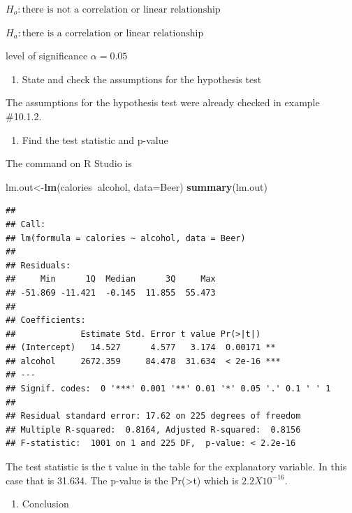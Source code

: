 \documentclass[]{book}
\newenvironment{Shaded}{\begin{snugshade}}{\end{snugshade}}
\newcommand{\DataTypeTok}[1]{\textcolor[rgb]{0.13,0.29,0.53}{#1}}
\newcommand{\KeywordTok}[1]{\textcolor[rgb]{0.13,0.29,0.53}{\textbf{#1}}}
\newcommand{\NormalTok}[1]{#1}
\newcommand{\OperatorTok}[1]{\textcolor[rgb]{0.81,0.36,0.00}{\textbf{#1}}}
\providecommand{\tightlist}{%
  \setlength{\itemsep}{0pt}\setlength{\parskip}{0pt}}
\begin{document}
\(H_o: \text{there is not a correlation or linear relationship}\)

\(H_a: \text{there is a correlation or linear relationship}\)

level of significance \(\alpha=0.05\)

\begin{enumerate}
\def\labelenumi{\arabic{enumi}.}
\setcounter{enumi}{2}
\tightlist
\item
  State and check the assumptions for the hypothesis test
\end{enumerate}

The assumptions for the hypothesis test were already checked in example \#10.1.2.

\begin{enumerate}
\def\labelenumi{\arabic{enumi}.}
\setcounter{enumi}{3}
\tightlist
\item
  Find the test statistic and p-value
\end{enumerate}

The command on R Studio is

\begin{Shaded}
\begin{Highlighting}[]
\NormalTok{lm.out<-}\KeywordTok{lm}\NormalTok{(calories}\OperatorTok{~}\NormalTok{alcohol, }\DataTypeTok{data=}\NormalTok{Beer)}
\KeywordTok{summary}\NormalTok{(lm.out)}
\end{Highlighting}
\end{Shaded}

\begin{verbatim}
## 
## Call:
## lm(formula = calories ~ alcohol, data = Beer)
## 
## Residuals:
##     Min      1Q  Median      3Q     Max 
## -51.869 -11.421  -0.145  11.855  55.473 
## 
## Coefficients:
##             Estimate Std. Error t value Pr(>|t|)    
## (Intercept)   14.527      4.577   3.174  0.00171 ** 
## alcohol     2672.359     84.478  31.634  < 2e-16 ***
## ---
## Signif. codes:  0 '***' 0.001 '**' 0.01 '*' 0.05 '.' 0.1 ' ' 1
## 
## Residual standard error: 17.62 on 225 degrees of freedom
## Multiple R-squared:  0.8164, Adjusted R-squared:  0.8156 
## F-statistic:  1001 on 1 and 225 DF,  p-value: < 2.2e-16
\end{verbatim}

The test statistic is the t value in the table for the explanatory variable. In this case that is 31.634. The p-value is the Pr(\textgreater{}\textbar{}t\textbar{}) which is \(2.2X10^{-16}\).

\begin{enumerate}
\def\labelenumi{\arabic{enumi}.}
\setcounter{enumi}{4}
\tightlist
\item
  Conclusion
\end{enumerate}
\end{document}
